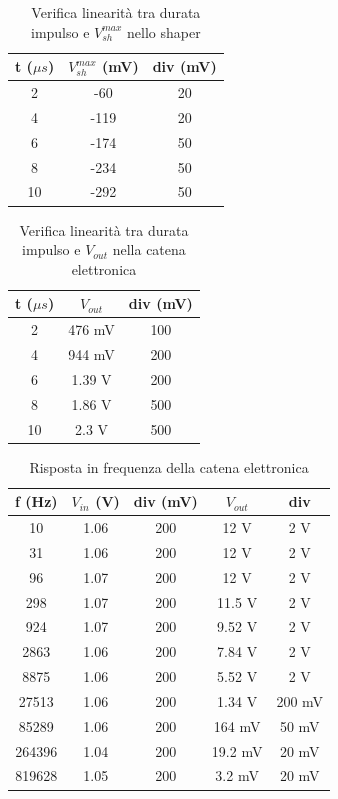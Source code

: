 \documentclass{article}
\begin{document}
\begin{table}[H]
    \centering
    \begin{tabular}{ccc}
        \toprule
        t ($\mu s$) & $V_{sh}^{max}$ (mV) & div (mV) \\
        \midrule
        2 & -60 & 20 \\
        4 & -119 & 20 \\
        6 & -174 & 50 \\
        8 & -234 & 50 \\
        10 & -292 & 50 \\
        \bottomrule
    \end{tabular}
    \caption{Verifica linearità tra durata impulso e $V_{sh}^{max}$ nello shaper}
\end{table}


\begin{table}[H]
    \centering
    \begin{tabular}{ccc}
        \toprule
        t ($\mu s$) & $V_{out}$ & div (mV) \\
        \midrule
        2 & 476 mV& 100 \\
        4 & 944 mV& 200 \\
        6 & 1.39 V & 200 \\
        8 & 1.86 V & 500 \\
        10 & 2.3 V & 500 \\
        \bottomrule
    \end{tabular}
    \caption{Verifica linearità tra durata impulso e $V_{out}$ nella catena elettronica}
\end{table}


\begin{table}[H]
    \centering
    \begin{tabular}{ccccc}
        \toprule
        f (Hz) & $V_{in}$ (V) & div (mV) & $V_{out}$ & div\\
        \midrule
        10 & 1.06 & 200 & 12 V & 2 V\\
        31 & 1.06 & 200 & 12 V& 2 V\\
        96 & 1.07 & 200 & 12 V& 2 V\\
        298 & 1.07 & 200 & 11.5 V& 2 V\\
        924 & 1.07 & 200 & 9.52 V& 2 V\\
        2863 & 1.06 & 200 & 7.84 V& 2 V\\
        8875 & 1.06 & 200 & 5.52 V& 2 V\\
        27513 & 1.06 & 200 & 1.34 V& 200 mV\\
        85289 & 1.06 & 200 & 164 mV& 50 mV\\
        264396 & 1.04 & 200 & 19.2 mV & 20 mV\\
        819628 & 1.05 & 200 & 3.2 mV & 20 mV\\
        \bottomrule
    \end{tabular}
    \caption{Risposta in frequenza della catena elettronica}
\end{table}
\end{document}
